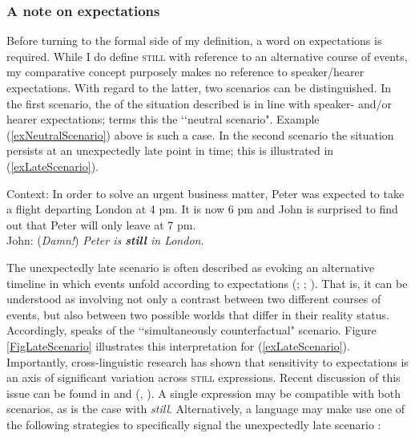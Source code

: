 \subsubsection{A note on expectations}\label{sectionExpectation}
Before turning to the formal side of my definition, a word on expectations is required. While I do define \textsc{still} with reference to an alternative course of events, my comparative concept purposely makes no reference to speaker/hearer expectations. With regard to the latter, two scenarios can be distinguished. In the first scenario, the  of the situation described is in line with speaker- and/or hearer expectations; \textcite[ch. 2]{vanBaar1997} terms this the \lq\lq neutral scenario". Example (\ref{exNeutralScenario}) above is such a case. In the second scenario the situation persists at an unexpectedly late point in time; this is illustrated in (\ref{exLateScenario}). 
\begin{exe}
\ex \label{exLateScenario}
Context: In order to solve an urgent business matter, Peter was expected to take a flight departing London at 4 pm. It is now 6 pm and John is surprised to find out that Peter will only leave at 7 pm.\\
John: (\textit{Damn!}) \textit{Peter is \textbf{still} in London}. \parencite[33]{vanBaar1997}
\end{exe}

The unexpectedly late scenario is often described as evoking an alternative timeline in which events unfold according  to expectations (\cite[38–42]{vanderAuwera1998}; \cite[ch. 2]{vanBaar1997}; \cite{Michaelis1993}). That is, it can be understood as involving not only a contrast between two different courses of events, but also between two possible worlds that differ in their reality status. Accordingly, \textcite{vanBaar1997} speaks of the \lq\lq simultaneously counterfactual" scenario. Figure \ref{FigLateScenario} illustrates this interpretation for (\ref{exLateScenario}). Importantly, cross-linguistic research has shown that sensitivity to expectations is an axis of significant variation across \textsc{still} expressions. Recent discussion of this issue can be found in \textcite{vanderAuwera2021} and \citeauthor{Kramer2017} (\citeyear{Kramer2017}, \citeyear*{Kramer2021b}). A single expression may be compatible with both scenarios, as is the case with  \textit{still}. Alternatively, a language may make use one of the following strategies to specifically signal the unexpectedly late scenario \parencite[134]{vanBaar1997}:

